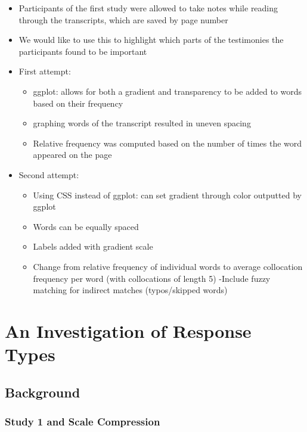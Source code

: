 \documentclass[print]{nuthesis}
\providecommand{\tightlist}{%
  \setlength{\itemsep}{0pt}\setlength{\parskip}{0pt}}
\begin{document}
\begin{itemize}
\item
  Participants of the first study were allowed to take notes while reading through the transcripts, which are saved by page number
\item
  We would like to use this to highlight which parts of the testimonies the participants found to be important
\item
  First attempt:

  \begin{itemize}
  \tightlist
  \item
    ggplot: allows for both a gradient and transparency to be added to words based on their frequency
  \item
    graphing words of the transcript resulted in uneven spacing
  \item
    Relative frequency was computed based on the number of times the word appeared on the page
  \end{itemize}
\item
  Second attempt:

  \begin{itemize}
  \tightlist
  \item
    Using CSS instead of ggplot: can set gradient through color outputted by ggplot
  \item
    Words can be equally spaced
  \item
    Labels added with gradient scale
  \item
    Change from relative frequency of individual words to average collocation frequency per word (with collocations of length 5)
    -Include fuzzy matching for indirect matches (typos/skipped words)
  \end{itemize}
\end{itemize}

\hypertarget{study2}{%
\chapter{An Investigation of Response Types}\label{study2}}

\hypertarget{background-2}{%
\section{Background}\label{background-2}}

\hypertarget{study-1-and-scale-compression}{%
\subsection{Study 1 and Scale Compression}\label{study-1-and-scale-compression}}
\end{document}
